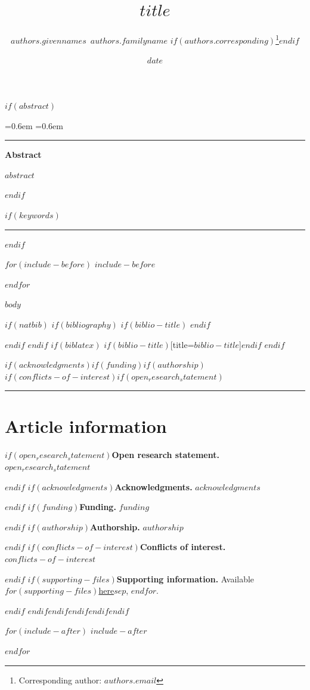 \documentclass[11pt]{article}
\title{\vspace{-2.0em}%
  {\sffamily\bfseries\fontsize{18}{22}\selectfont\color{accent}$title$}\vspace{0.2em}}
\author[$for(authors.affiliations)$$authors.affiliations$$sep$,$endfor$]{%
  $authors.givennames$~$authors.familyname$%
  $if(authors.corresponding)$\thanks{Corresponding author: \href{mailto:$authors.email$}{$authors.email$}}$endif$%
}
\affil[$affiliations.index$]{$affiliations.name$}
\date{\footnotesize\color{soft}$date$}
\newenvironment{preprintabstract}
  {\par\medskip
   \begingroup
   \leftskip=0.6em \rightskip=0.6em
   \small
   \noindent\textcolor{accent}{\rule{2.5em}{1.2pt}}\par\smallskip
   \noindent\textsf{\bfseries\color{accent}Abstract}\par\smallskip}
  {\par\endgroup\medskip}
\begin{document}
\maketitle
\thispagestyle{firstpage}
\vspace{-1.2em}

$if(abstract)$
\begin{preprintabstract}
$abstract$
\end{preprintabstract}
$endif$

$if(keywords)$
\par\medskip
\noindent\textcolor{rule}{\rule{\linewidth}{0.4pt}}
$endif$

$for(include-before)$
$include-before$

$endfor$

$body$

\newpage

$if(natbib)$
$if(bibliography)$
$if(biblio-title)$
\renewcommand\refname{$biblio-title$}
$endif$


$endif$
$endif$
$if(biblatex)$
\printbibliography$if(biblio-title)$[title=$biblio-title$]$endif$
$endif$

$if(acknowledgments)$$if(funding)$$if(authorship)$$if(conflicts-of-interest)$$if(open_research_statement)$
\bigskip
\noindent\textcolor{rule}{\rule{\linewidth}{0.4pt}}\par
\section*{\sffamily\normalsize\color{accent}Article information}
\begingroup\small\color{soft}
$if(open_research_statement)$\noindent\textbf{Open research statement.} $open_research_statement$\par\smallskip$endif$
$if(acknowledgments)$\noindent\textbf{Acknowledgments.} $acknowledgments$\par\smallskip$endif$
$if(funding)$\noindent\textbf{Funding.} $funding$\par\smallskip$endif$
$if(authorship)$\noindent\textbf{Authorship.} $authorship$\par\smallskip$endif$
$if(conflicts-of-interest)$\noindent\textbf{Conflicts of interest.} $conflicts-of-interest$\par\smallskip$endif$
$if(supporting-files)$\noindent\textbf{Supporting information.} Available $for(supporting-files)$\href{https://$github-user$.github.io/$github-repo$/$supporting-files$.pdf}{here}$sep$, $endfor$.\par$endif$
\endgroup
$endif$$endif$$endif$$endif$$endif$

$for(include-after)$
$include-after$

$endfor$
\end{document}
